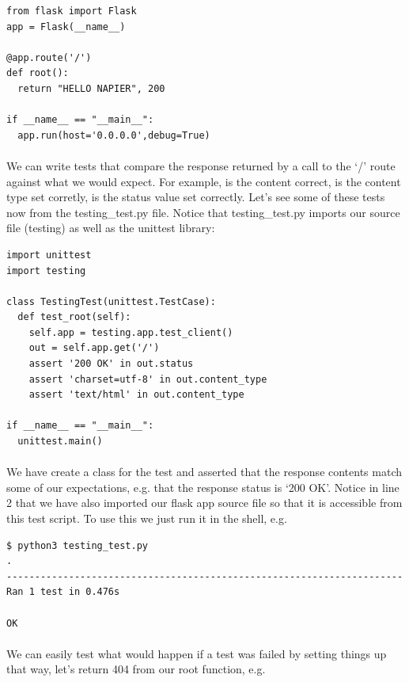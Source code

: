 \documentclass[12pt, a4paper, oneside]{book}
\begin{document}
{\begin{lstlisting}
from flask import Flask
app = Flask(__name__)

@app.route('/')
def root():
  return "HELLO NAPIER", 200

if __name__ == "__main__":
  app.run(host='0.0.0.0',debug=True)
\end{lstlisting}

\paragraph{} We can write tests that compare the response returned by a call to the `/' route against what we would expect. For example, is the content correct, is the content type set corretly, is the status value set correctly. Let's see some of these tests now from the testing\_test.py file. Notice that testing\_test.py imports our source file (testing) as well as the unittest library:

\begin{lstlisting}
import unittest
import testing

class TestingTest(unittest.TestCase):
  def test_root(self):
    self.app = testing.app.test_client()
    out = self.app.get('/')
    assert '200 OK' in out.status
    assert 'charset=utf-8' in out.content_type
    assert 'text/html' in out.content_type

if __name__ == "__main__":
  unittest.main()
\end{lstlisting}

\paragraph{} We have create a class for the test and asserted that the response contents match some of our expectations, e.g. that the response status is `200 OK'. Notice in line 2 that we have also imported our flask app source file so that it is accessible from this test script. To use this we just run it in the shell, e.g.

\begin{lstlisting}[style=DOS]
$ python3 testing_test.py 
.
----------------------------------------------------------------------
Ran 1 test in 0.476s

OK
\end{lstlisting}
\paragraph{} We can easily test what would happen if a test was failed by setting things up that way, let's return 404 from our root function, e.g.

}
\end{document}
